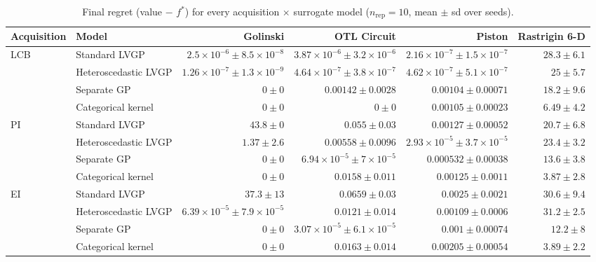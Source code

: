\begin{table}[htbp]
\centering
\small
\setlength{\tabcolsep}{4pt}
\setlength{\fboxsep}{2pt}
\caption{Final regret (value $-$ $f^*$) for every acquisition $\times$ surrogate model ($n_{\mathrm{rep}}=10$, mean $\pm$ sd over seeds).}
\label{tab:regret_nrep10}
\begin{tabular}{llrrrr}
\toprule
Acquisition & Model & Golinski & OTL Circuit & Piston & Rastrigin 6-D \\
\midrule
LCB & Standard LVGP & $2.5{\times}10^{-6} \pm 8.5{\times}10^{-8}$ & $3.87{\times}10^{-6} \pm 3.2{\times}10^{-6}$ & \colorbox{green!20}{{\boldmath$2.16{\times}10^{-7} \pm 1.5{\times}10^{-7}$}} & $28.3 \pm 6.1$ \\
 & Heteroscedastic LVGP & $1.26{\times}10^{-7} \pm 1.3{\times}10^{-9}$ & $4.64{\times}10^{-7} \pm 3.8{\times}10^{-7}$ & $4.62{\times}10^{-7} \pm 5.1{\times}10^{-7}$ & $25 \pm 5.7$ \\
 & Separate GP & \colorbox{green!20}{{\boldmath$0 \pm 0$}} & $0.00142 \pm 0.0028$ & $0.00104 \pm 0.00071$ & $18.2 \pm 9.6$ \\
 & Categorical kernel & \colorbox{green!20}{{\boldmath$0 \pm 0$}} & \colorbox{green!20}{{\boldmath$0 \pm 0$}} & $0.00105 \pm 0.00023$ & {\boldmath$6.49 \pm 4.2$} \\
\midrule
PI & Standard LVGP & $43.8 \pm 0$ & $0.055 \pm 0.03$ & $0.00127 \pm 0.00052$ & $20.7 \pm 6.8$ \\
 & Heteroscedastic LVGP & $1.37 \pm 2.6$ & $0.00558 \pm 0.0096$ & {\boldmath$2.93{\times}10^{-5} \pm 3.7{\times}10^{-5}$} & $23.4 \pm 3.2$ \\
 & Separate GP & \colorbox{green!20}{{\boldmath$0 \pm 0$}} & {\boldmath$6.94{\times}10^{-5} \pm 7{\times}10^{-5}$} & $0.000532 \pm 0.00038$ & $13.6 \pm 3.8$ \\
 & Categorical kernel & \colorbox{green!20}{{\boldmath$0 \pm 0$}} & $0.0158 \pm 0.011$ & $0.00125 \pm 0.0011$ & \colorbox{green!20}{{\boldmath$3.87 \pm 2.8$}} \\
\midrule
EI & Standard LVGP & $37.3 \pm 13$ & $0.0659 \pm 0.03$ & $0.0025 \pm 0.0021$ & $30.6 \pm 9.4$ \\
 & Heteroscedastic LVGP & $6.39{\times}10^{-5} \pm 7.9{\times}10^{-5}$ & $0.0121 \pm 0.014$ & $0.00109 \pm 0.0006$ & $31.2 \pm 2.5$ \\
 & Separate GP & \colorbox{green!20}{{\boldmath$0 \pm 0$}} & {\boldmath$3.07{\times}10^{-5} \pm 6.1{\times}10^{-5}$} & {\boldmath$0.001 \pm 0.00074$} & $12.2 \pm 8$ \\
 & Categorical kernel & \colorbox{green!20}{{\boldmath$0 \pm 0$}} & $0.0163 \pm 0.014$ & $0.00205 \pm 0.00054$ & {\boldmath$3.89 \pm 2.2$} \\

\end{tabular}
\end{table}
